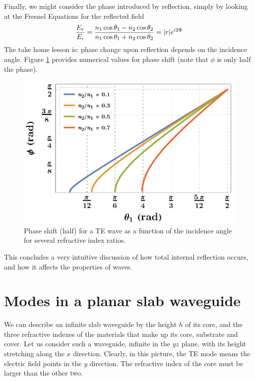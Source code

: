 Finally, we might consider the phase introduced by reflection, simply by looking at the Fresnel Equations for the reflected field
\begin{equation}
    \frac{E_r}{E_i}=\frac{n_1\cos\theta_1-n_2\cos\theta_2}{n_1\cos\theta_1+n_2\cos\theta_2}=\abs{r}e^{i2\Phi}
\end{equation}
The take home lesson is: phase change upon reflection depends on the incidence angle. Figure \ref{fig:phase.at.TIR} provides numerical values for phase shift (note that $\phi$ is only half the phase).

\begin{figure}[H]
    \centering
    \includegraphics[width=0.8\linewidth]{Figuras/phase shift at TIR.png}
    \caption{Phase shift (half) for a TE wave as a function of the incidence angle for several refractive index ratios.}
    \label{fig:phase.at.TIR}
\end{figure}

This concludes a very intuitive discussion of how total internal reflection occurs, and how it affects the properties of waves.

\section{Modes in a planar slab waveguide}

We can describe an infinite slab waveguide by the height $h$ of its core, and the three refractive indexes of the materials that make up its core, substrate and cover. Let us consider such a waveguide, infinite in the $yz$ plane, with its height stretching along the $x$ direction. Clearly, in this picture, the TE mode means the electric field points in the $y$ direction. The refractive index of the core must be larger than the other two.


